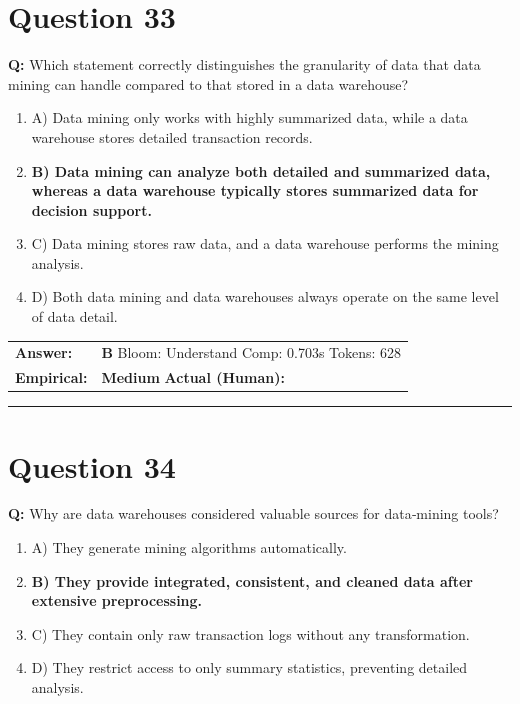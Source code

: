 \documentclass[9pt]{article}
\begin{document}
\section*{Question 33}

\textbf{Q:} Which statement correctly distinguishes the granularity of data that data mining can handle compared to that stored in a data warehouse?

\begin{enumerate}[label=\textbf{\alph{*})}, nosep]
    \item A) Data mining only works with highly summarized data, while a data warehouse stores detailed transaction records.
    \item \textbf{B) Data mining can analyze both detailed and summarized data, whereas a data warehouse typically stores summarized data for decision support.} %
    \item C) Data mining stores raw data, and a data warehouse performs the mining analysis.
    \item D) Both data mining and data warehouses always operate on the same level of data detail.

\end{enumerate}

\begin{tabular}{@{}l p{10.5cm}@{}}
\textbf{Answer:} & \textbf{B} \hspace{1em} Bloom: Understand \hspace{1em} Comp: 0.703s \hspace{1em} Tokens: 628 \\
\textbf{Empirical:} & \textbf{Medium} \hspace{1em} \textbf{Actual (Human):} \underline{\hspace{5cm}}
\end{tabular}

\vspace{0.2cm}
\rule{\textwidth}{0.4pt}
\vspace{0.2cm}


\section*{Question 34}

\textbf{Q:} Why are data warehouses considered valuable sources for data‑mining tools?

\begin{enumerate}[label=\textbf{\alph{*})}, nosep]
    \item A) They generate mining algorithms automatically.
    \item \textbf{B) They provide integrated, consistent, and cleaned data after extensive preprocessing.} %
    \item C) They contain only raw transaction logs without any transformation.
    \item D) They restrict access to only summary statistics, preventing detailed analysis.

\end{enumerate}
\end{document}
